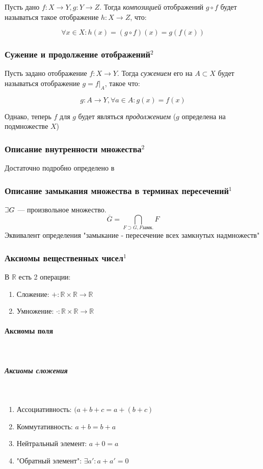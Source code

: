 \documentclass{article}
\def\letus{%
\mathord{\setbox0=\hbox{$\exists$}%
         \hbox{\kern 0.125\wd0%
               \vbox to \ht0{%
                  \hrule width 0.75\wd0%
                  \vfill%
                  \hrule width 0.75\wd0}%
               \vrule height \ht0%
               \kern 0.125\wd0}%
       }%
        }
\let\vanillaparagraph\paragraph
\let\vanillasubparagraph\subparagraph
\renewcommand{\paragraph}[1]{\vanillaparagraph{#1}\mbox{}\\}
\renewcommand{\subparagraph}[1]{\vanillasubparagraph{#1}\mbox{}\\}
\begin{document}
Пусть дано $f: X \rightarrow Y, g: Y \rightarrow Z$. Тогда \textit{композицией} отображений $g \circ f$ будет называться такое отображение $h: X \rightarrow Z$, что:

\[\forall x \in X : h(x) = (g \circ f)(x) = g(f(x))\]

\subsubsection{Сужение и продолжение отображений\texorpdfstring{$^2$}{}}

Пусть задано отображение $f: X \rightarrow Y$. Тогда \textit{сужением}
его на $A \subset X$ будет называться отображение $g = f|_A$, такое что:

\[g: A \rightarrow Y, \forall a \in A : g(x) = f(x)\]

Однако, теперь $f$ для $g$ будет являться \textit{продолжением} ($g$ определена на подмножестве $X$)

\subsubsection{Описание внутренности множества\texorpdfstring{$^2$}{}}
Достаточно подробно определено в\\ 

\subsubsection{Описание замыкания множества в терминах пересечений\texorpdfstring{$^1$}{}}
$\letus G$ --- произвольное множество.
$$
\overline{G} = \underset{F\supset G, F \text{замк.}}{\bigcap} F
$$
Эквивалент определения "замыкание - пересечение всех замкнутых надмножеств"

\subsubsection{Аксиомы вещественных чисел\texorpdfstring{$^1$}{}}
В $\mathbb{R}$ есть 2 операции:
\begin{enumerate}
    \item Сложение: $+: \mathbb{R} \times \mathbb{R} \rightarrow \mathbb{R}$
    \item Умножение: $\cdot: \mathbb{R} \times \mathbb{R} \rightarrow \mathbb{R}$
\end{enumerate}

\paragraph{Аксиомы поля}
\subparagraph{Аксиомы сложения}
\begin{enumerate}
    \item Ассоциативность: $(a + b + c = a + (b + c)$
    \item Коммутативность: $a + b = b + a$
    \item Нейтральный элемент: $a + 0 = a$
    \item "Обратный элемент": $\exists a' : a + a' = 0$
\end{enumerate}
\end{document}

